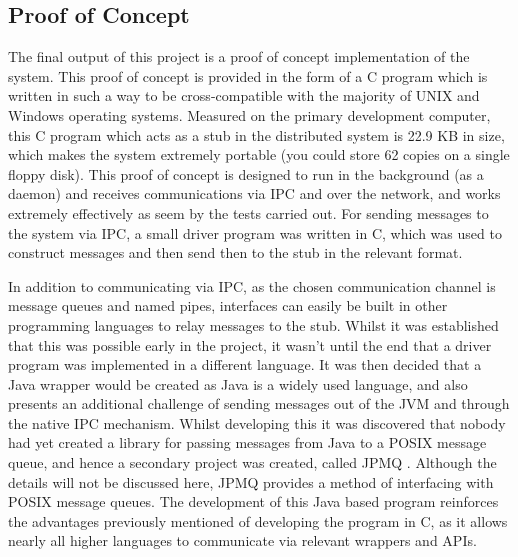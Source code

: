 \documentclass[a4paper, 11pt]{report}
\begin{document}
\subsection{Proof of Concept}
The final output of this project is a proof of concept implementation of the system. This proof of concept is provided in the form of a C program which is written in such a way to be cross-compatible with the majority of UNIX and Windows operating systems. Measured on the primary development computer, this C program which acts as a \gls{stub} in the distributed system is 22.9 KB in size, which makes the system extremely portable (you could store 62 copies on a single floppy disk). This proof of concept is designed to run in the background (as a daemon) and receives communications via \acrshort{IPC} and over the network, and works extremely effectively as seem by the tests carried out. For sending messages to the system via \acrshort{IPC}, a small driver program was written in C, which was used to construct messages and then send then to the \gls{stub} in the relevant format.

In addition to communicating via \acrshort{IPC}, as the chosen communication channel is message queues and named pipes, interfaces can easily be built in other programming languages to relay messages to the \gls{stub}. Whilst it was established that this was possible early in the project, it wasn't until the end that a driver program was implemented in a different language. It was then decided that a Java wrapper would be created as Java is a widely used language, and also presents an additional challenge of sending messages out of the JVM and through the native \acrshort{IPC} mechanism. Whilst developing this it was discovered that nobody had yet created a library for passing messages from Java to a POSIX message queue, and hence a secondary project was created, called JPMQ \cite{jpmq}. Although the details will not be discussed here, JPMQ provides a method of interfacing with \acrshort{POSIX} message queues. The development of this Java based program reinforces the advantages previously mentioned of developing the program in C, as it allows nearly all higher languages to communicate via relevant wrappers and \acrshort{API}s.
\end{document}
